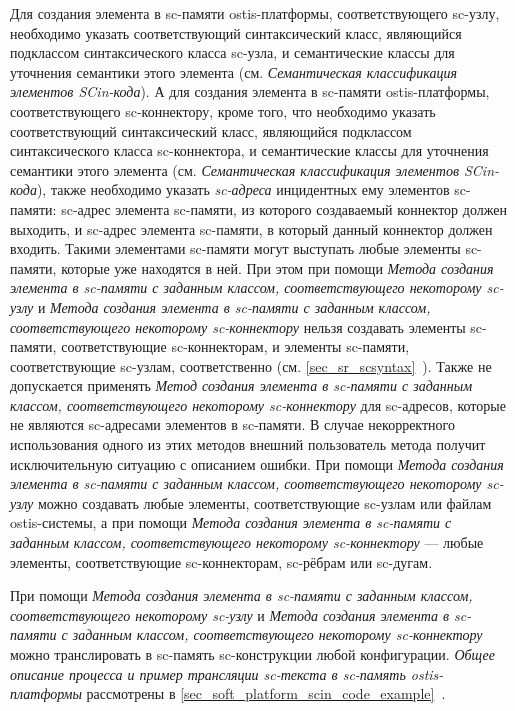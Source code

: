 Для создания элемента в sc-памяти ostis-платформы, соответствующего sc-узлу, необходимо указать соответствующий синтаксический класс, являющийся подклассом синтаксического класса sc-узла, и семантические классы для уточнения семантики этого элемента (см. \textit{Семантическая классификация элементов SCin-кода}). А для создания элемента в sc-памяти ostis-платформы, соответствующего sc-коннектору, кроме того, что необходимо указать соответствующий синтаксический класс, являющийся подклассом синтаксического класса sc-коннектора, и семантические классы для уточнения семантики этого элемента (см. \textit{Семантическая классификация элементов SCin-кода}), также необходимо указать \textit{sc-адреса} инцидентных ему элементов sc-памяти: sc-адрес элемента sc-памяти, из которого создаваемый коннектор должен выходить, и sc-адрес элемента sc-памяти, в который данный коннектор должен входить. Такими элементами sc-памяти могут выступать любые элементы sc-памяти, которые уже находятся в ней. При этом при помощи \textit{Метода создания элемента в sc-памяти с заданным классом, соответствующего некоторому sc-узлу} и \textit{Метода создания элемента в sc-памяти с заданным классом, соответствующего некоторому sc-коннектору} нельзя создавать элементы sc-памяти, соответствующие sc-коннекторам, и элементы sc-памяти, соответствующие sc-узлам, соответственно (см. \ref{sec_sr_scsyntax}~). Также не допускается применять \textit{Метод создания элемента в sc-памяти с заданным классом, соответствующего некоторому sc-коннектору} для sc-адресов, которые не являются sc-адресами элементов в sc-памяти. В случае некорректного использования одного из этих методов внешний пользователь метода получит исключительную ситуацию с описанием ошибки. При помощи \textit{Метода создания элемента в sc-памяти с заданным классом, соответствующего некоторому sc-узлу} можно создавать любые элементы, соответствующие sc-узлам или файлам ostis-системы, а при помощи \textit{Метода создания элемента в sc-памяти с заданным классом, соответствующего некоторому sc-коннектору} --- любые элементы, соответствующие sc-коннекторам, sc-рёбрам или sc-дугам.

При помощи \textit{Метода создания элемента в sc-памяти с заданным классом, соответствующего некоторому sc-узлу} и \textit{Метода создания элемента в sc-памяти с заданным классом, соответствующего некоторому sc-коннектору} можно транслировать в sc-память sc-конструкции любой конфигурации. \textit{Общее описание процесса и пример трансляции sc-текста в sc-память ostis-платформы} рассмотрены в \ref{sec_soft_platform_scin_code_example}~.

